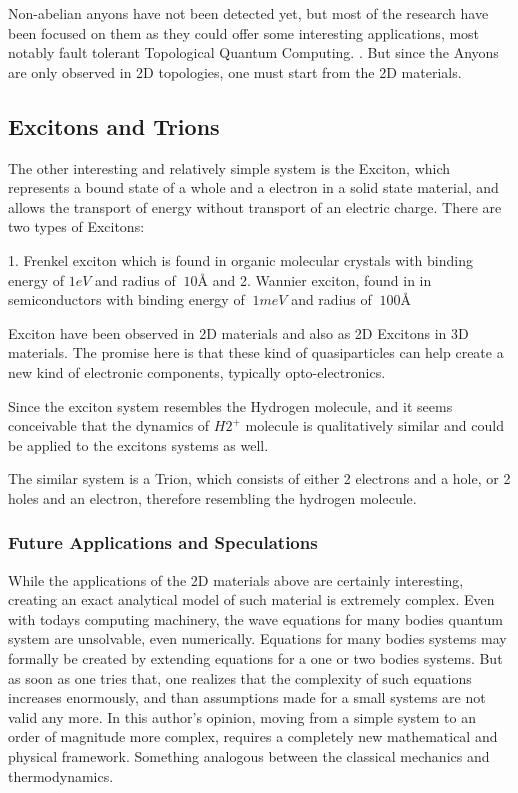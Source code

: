 Non-abelian anyons have not been detected yet, but most of the research have been focused on them as  they could offer some interesting applications, most notably  fault tolerant Topological Quantum Computing. \cite{AnyonsTqc}. But since the Anyons are only observed in 2D topologies, one must start from the 2D materials.


\subsection{Excitons and Trions}

The other interesting and relatively simple system is the Exciton, which represents a bound state of a whole and a electron in a solid state material, and allows the transport of energy without transport of an electric charge. There are two types of Excitons: 

1. Frenkel exciton which is found in organic molecular crystals \cite{Excitons3} with binding energy of $ 1eV $ and radius of $ ~ 10\text{\AA} $ and 
2. Wannier exciton, found in in semiconductors \cite{Excitons2}  with binding energy of $ ~1meV $ and radius of $ ~100\text{\AA} $

Exciton have been observed in 2D materials \cite{Excitons2D1, Excitons2D2} and also as 2D Excitons in 3D materials. The promise here is that these kind of quasiparticles can help create a new kind of electronic components, typically opto-electronics.

Since the exciton system resembles the Hydrogen molecule, and it seems conceivable that the dynamics of  $ H2^{+} $ molecule is qualitatively similar and could be applied to the excitons systems as well.

The similar system is a Trion, which consists of either 2 electrons and a hole, or 2 holes and an electron, therefore resembling the hydrogen molecule.

\subsubsection{Future Applications and Speculations}

While the applications of the 2D materials above are certainly interesting, creating an exact analytical  model of such material is extremely complex. Even with todays computing machinery, the wave equations for many bodies quantum system are unsolvable, even numerically.  Equations for many bodies systems may formally be created by extending equations for a one or two bodies systems. But as soon as one tries that, one realizes that the complexity of such equations increases enormously, and than assumptions  made for a small systems are not valid any more. In this author's opinion, moving from a simple system to an order of magnitude more complex, requires a completely new mathematical and physical framework. Something analogous between the classical mechanics and thermodynamics.

